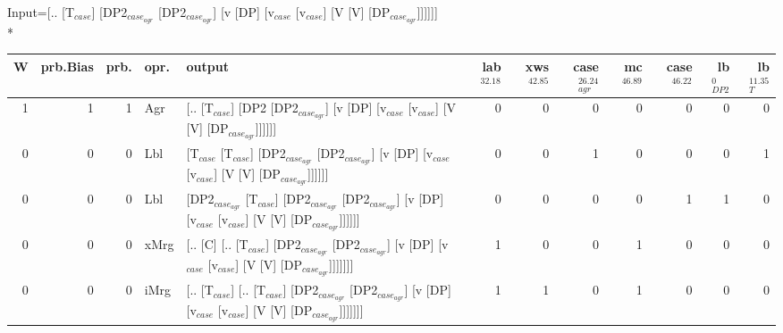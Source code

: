 \begingroup\scriptsize Input=[.. [T$_{case}$] [DP2$_{case_{agr}}$ [DP2$_{case_{agr}}$] [v [DP] [v$_{case}$ [v$_{case}$] [V [V] [DP$_{case_{agr}}$]]]]]]\\*
\begin{tabularx}{\linewidth}{rrrlXrrrrrrr}
\hline
   W &   prb.Bias &   prb. & opr.   & output                                                                                                                                                                           &   lab$^{32.18}$ &   xws$^{42.85}$ &   case$_{agr}^{26.24}$ &   mc$^{46.89}$ &   case$^{46.22}$ &   lb$_{DP2}^{0}$ &   lb$_{T}^{11.35}$ \\
\hline
   1 &       1 &   1 & Agr  & [.. [T$_{case}$] [DP2 [DP2$_{case_{agr}}$] [v [DP] [v$_{case}$ [v$_{case}$] [V [V] [DP$_{case_{agr}}$]]]]]]                                                                                              &             0 &             0 &                  0 &            0 &              0 &            0 &              0 \\
   0 &       0 &   0 & Lbl  & [T$_{case}$ [T$_{case}$] [DP2$_{case_{agr}}$ [DP2$_{case_{agr}}$] [v [DP] [v$_{case}$ [v$_{case}$] [V [V] [DP$_{case_{agr}}$]]]]]]                                                                                 &             0 &             0 &                  1 &            0 &              0 &            0 &              1 \\
   0 &       0 &   0 & Lbl  & [DP2$_{case_{agr}}$ [T$_{case}$] [DP2$_{case_{agr}}$ [DP2$_{case_{agr}}$] [v [DP] [v$_{case}$ [v$_{case}$] [V [V] [DP$_{case_{agr}}$]]]]]]                                                                           &             0 &             0 &                  0 &            0 &              1 &            1 &              0 \\
   0 &       0 &   0 & xMrg & [.. [C] [.. [T$_{case}$] [DP2$_{case_{agr}}$ [DP2$_{case_{agr}}$] [v [DP] [v$_{case}$ [v$_{case}$] [V [V] [DP$_{case_{agr}}$]]]]]]]                                                                            &             1 &             0 &                  0 &            1 &              0 &            0 &              0 \\
   0 &       0 &   0 & iMrg & [.. [T$_{case}$] [.. [T$_{case}$] [DP2$_{case_{agr}}$ [DP2$_{case_{agr}}$] [v [DP] [v$_{case}$ [v$_{case}$] [V [V] [DP$_{case_{agr}}$]]]]]]]                                                                       &             1 &             1 &                  0 &            1 &              0 &            0 &              0 \\

\end{tabularx}
